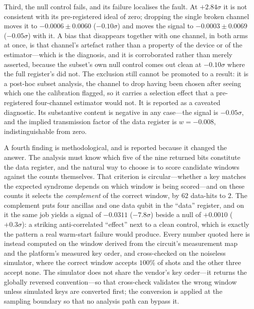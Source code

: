 \documentclass[aps,prxquantum,reprint,superscriptaddress]{revtex4-2}
\begin{document}
Third, the null control fails, and its failure localises the fault. At
$+2.84\sigma$ it is not consistent with its pre-registered ideal of zero;
dropping the single broken channel moves it to $-0.0006\pm0.0060$
($-0.10\sigma$) and moves the signal to $-0.0003\pm0.0069$ ($-0.05\sigma$) with
it. A bias that disappears together with one channel, in both arms at once, is
that channel's artefact rather than a property of the device or of the
estimator---which is the diagnosis, and it is corroborated rather than merely
asserted, because the subset's own null control comes out clean at $-0.10\sigma$
where the full register's did not. The exclusion still cannot be promoted to a
result: it is a post-hoc subset analysis, the channel to drop having been chosen
after seeing which one the calibration flagged, so it carries a selection effect
that a pre-registered four-channel estimator would not. It is reported as a
caveated diagnostic. Its substantive content is negative in any case---the signal
is $-0.05\sigma$, and the implied transmission factor of the data register is
$w=-0.008$, indistinguishable from zero.

A fourth finding is methodological, and is reported because it changed the
answer. The analysis must know which five of the nine returned bits constitute
the data register, and the natural way to choose is to score candidate windows
against the counts themselves. That criterion is circular---whether a key matches
the expected syndrome depends on which window is being scored---and on these
counts it selects the \emph{complement} of the correct window, by $62$ data-hits
to $2$. The complement puts four ancillas and one data qubit in the ``data''
register, and on it the same job yields a signal of $-0.0311$ ($-7.8\sigma$)
beside a null of $+0.0010$ ($+0.3\sigma$): a striking anti-correlated ``effect''
next to a clean control, which is exactly the pattern a real warm-start failure
would produce. Every number quoted here is instead computed on the window derived
from the circuit's measurement map and the platform's measured key order, and
cross-checked on the noiseless simulator, where the correct window accepts
$100\%$ of shots and the other three accept none. The simulator does not share
the vendor's key order---it returns the globally reversed convention---so that
cross-check validates the wrong window unless simulated keys are converted
first; the conversion is applied at the sampling boundary so that no analysis
path can bypass it.
\end{document}
